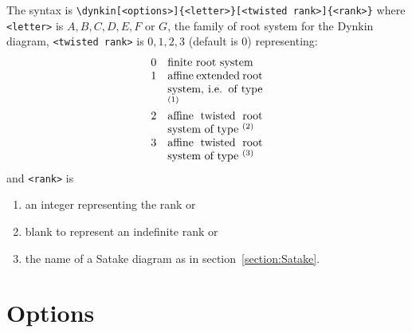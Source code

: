 \documentclass{amsart}
\begin{document}
The syntax is \verb!\dynkin[<options>]{<letter>}[<twisted rank>]{<rank>}! where \verb!<letter>! is \(A,B,C,D,E,F\) or \(G\), the family of root system for the Dynkin diagram, \verb!<twisted rank>! is \(0,1,2,3\) (default is 0) representing:
\[
\begin{array}{rp{3cm}}
0 & finite root system \\
1 & affine extended root system, i.e.  of type \({}^{(1)}\) \\
2 & affine twisted root system of type \({}^{(2)}\) \\
3 & affine twisted root system of type \({}^{(3)}\) \\
\end{array}
\]
and \verb!<rank>! is 
\begin{enumerate}
\item
an integer representing the rank or 
\item
blank to represent an indefinite rank or
\item
the name of a Satake diagram as in section~\ref{section:Satake}.
\end{enumerate}



\section{Options}

\newcommand*{\typ}[1]{\(\left<\texttt{#1}\right>\)}
\newcommand*{\optionLabel}[3]{%
\multicolumn{2}{l}{\(\texttt{#1}=\texttt{#2}\),} \\
\multicolumn{2}{l}{\(\textrm{default}: \texttt{#3}\)} \\
}%
\end{document}

